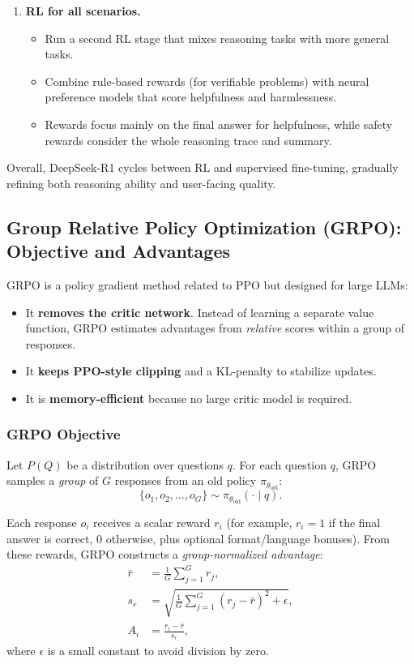 \documentclass[11pt]{article}
\theoremstyle{remark}
\newcommand{\highlight}[1]{\colorbox{yellow!40}{#1}}
\begin{document}
\begin{enumerate}[label=\arabic*)]
  \item \textbf{RL for all scenarios.}
  \begin{itemize}
    \item Run a second RL stage that mixes reasoning tasks with more general tasks.
    \item Combine rule-based rewards (for verifiable problems) with neural preference models that score helpfulness and harmlessness.
    \item Rewards focus mainly on the final answer for helpfulness, while safety rewards consider the whole reasoning trace and summary.
  \end{itemize}
\end{enumerate}

Overall, DeepSeek-R1 cycles between RL and supervised fine-tuning, gradually refining both reasoning ability and user-facing quality.

\subsection{ \highlight{ Group Relative Policy Optimization (GRPO)}: Objective and Advantages}

GRPO is a policy gradient method related to PPO but designed for large LLMs:

\begin{itemize}
  \item It \textbf{removes the critic network}. Instead of learning a separate value function, GRPO estimates advantages from \emph{relative} scores within a group of responses.
  \item It \textbf{keeps PPO-style clipping} and a KL-penalty to stabilize updates.
  \item It is \textbf{memory-efficient} because no large critic model is required.
\end{itemize}

\subsubsection*{GRPO Objective}

Let $P(Q)$ be a distribution over questions $q$. For each question $q$, GRPO samples a \emph{group} of $G$ responses from an old policy $\pi_{\theta_{\text{old}}}$:
\[
\{ o_1, o_2, \dots, o_G \} \sim \pi_{\theta_{\text{old}}}(\cdot \mid q).
\]

Each response $o_i$ receives a \highlight{ scalar reward $r_i$ } (for example, $r_i = 1$ if the final answer is correct, $0$ otherwise, plus optional format/language bonuses). From these rewards, GRPO constructs a \emph{group-normalized advantage}:
\begin{align*}
\bar{r} &= \frac{1}{G} \sum_{j=1}^G r_j, \\
s_r &= \sqrt{ \frac{1}{G} \sum_{j=1}^G (r_j - \bar{r})^2 + \epsilon }, \\
A_i &= \frac{r_i - \bar{r}}{s_r},
\end{align*}
where $\epsilon$ is a small constant to avoid division by zero.
\end{document}
